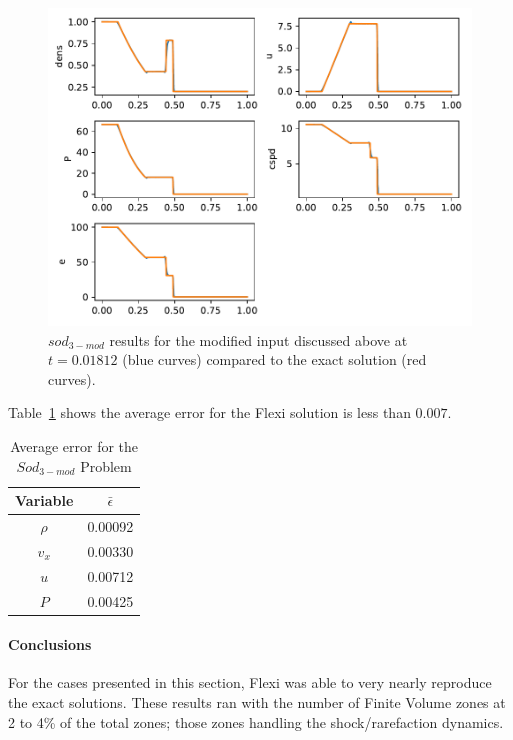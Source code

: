\begin{figure}[h!]
 \centering
 \includegraphics[scale=0.8]{figures/sod3-BC9-PV.pdf}
 \caption{$sod_{3-mod}$ results for the modified input discussed above at $t = 0.01812$ (blue curves) compared to the exact solution (red curves).}
 \label{fig:multiSod3-BC9}
\end{figure}

Table~\ref{tab:sod3Eps} shows the average error for the Flexi solution is less than $0.007$.

\begin{table}[h!]
 \centering
 \begin{tabular}{|c|c|} \hline
   Variable & $\bar{\epsilon}$ \\ \hline \hline
   $\rho$ & 0.00092 \\
   $v_x$  & 0.00330 \\
   $u$     & 0.00712 \\
   $P$     & 0.00425 \\ \hline
 \end{tabular}
 \caption{Average error for the $Sod_{3-mod}$ Problem}\label{tab:sod3Eps}
\end{table}

\paragraph{Conclusions}\label{pp:sodConc}
For the cases presented in this section, Flexi was able to very nearly reproduce the exact solutions. These results ran with the number of Finite Volume zones at 2 to 4\% of the total zones; those zones handling the shock/rarefaction dynamics.
